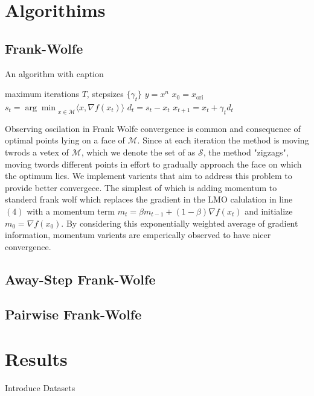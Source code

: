 \documentclass{article}
\begin{document}
\section{Algorithims}
\subsection{Frank-Wolfe}
\begin{algorithm}
\caption{An algorithm with caption}\label{alg:cap}
\begin{algorithmic}[1]
\Require maximum iterations $T$, stepsizes $\{\gamma_t\}$
\Ensure $y = x^n$
\State $x_0 = x_{\text{ori}}$
	\State $s_t = {\arg \min}_{x\in\mathcal{M}} \langle x, \nabla f(x_t)\rangle$
	\State $d_t = s_t - x_t$
	\State $x_{t+1} = x_t + \gamma_t d_t$
\EndFor
\end{algorithmic}
\end{algorithm}

Observing oscilation in Frank Wolfe convergence is common and consequence of optimal points lying on a face of $\mathcal{M}$. Since at each iteration the method is moving twrods a vetex of $\mathcal{M}$, which we denote the set of as $\mathcal{S}$, the method "zigzags", moving twords different points in effort to gradually approach the face on which the optimum lies. We implement varients that aim to address this problem to provide better convergece. The simplest of which is adding momentum to standerd frank wolf which replaces the gradient in the LMO calulation in line $(4)$ with a momentum term $m_t  = \beta m_{t-1} + (1-\beta) \nabla f(x_t)$ and initialize $m_0 = \nabla f(x_0)$. By considering this exponentially weighted average of gradient information, momentum varients are emperically observed to have nicer convergence. 
\subsection{Away-Step Frank-Wolfe}
\subsection{Pairwise Frank-Wolfe}

\section{Results}
Introduce Datasets
\end{document}
